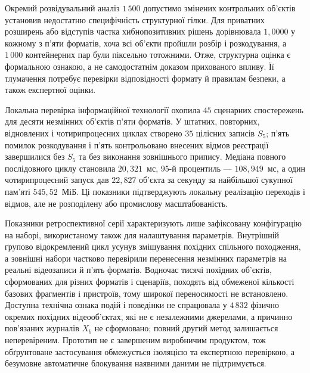 Окремий розвідувальний аналіз $1\,500$ допустимо змінених контрольних об’єктів установив недостатню специфічність структурної гілки. Для приватних розширень або відступів частка хибнопозитивних рішень дорівнювала $1{,}0000$ у кожному з п’яти форматів, хоча всі об’єкти пройшли розбір і розкодування, а $1\,000$ контейнерних пар були піксельно тотожними. Отже, структурна оцінка є формальною ознакою, а не самодостатнім доказом прихованого впливу. Її тлумачення потребує перевірки відповідності формату й правилам безпеки, а також експертної оцінки.

Локальна перевірка інформаційної технології охопила $45$ сценарних спостережень для десяти незмінних об’єктів п’яти форматів. У штатних, повторних, відновлених і чотирипроцесних циклах створено $35$ цілісних записів $S_5$; п’ять помилок розкодування і п’ять контрольовано внесених відмов реєстрації завершилися без $S_5$ та без виконання зовнішнього припису. Медіана повного послідовного циклу становила $20{,}321$~мс, 95-й процентиль --- $108{,}949$~мс, а один чотирипроцесний запуск дав $22{,}827$ об’єкта за секунду за найбільшої сукупної пам’яті $545{,}52$~МіБ. Ці показники підтверджують локальну реалізацію переходів і відмов, але не розподілену або промислову масштабованість.

Показники ретроспективної серії характеризують лише зафіксовану конфігурацію на наборі, використаному також для налаштування параметрів. Внутрішній групово відокремлений цикл усунув змішування похідних спільного походження, а зовнішні набори частково перевірили перенесення незмінних параметрів на реальні відеозаписи й п’ять форматів. Водночас тисячі похідних об’єктів, сформованих для різних форматів і сценаріїв, походять від обмеженої кількості базових фрагментів і пристроїв, тому широкої переносимості не встановлено. Доступна технічна ознака подій і поведінки не спрацювала у $4\,832$ фізично окремих похідних відеооб’єктах, які не є незалежними джерелами, а причинно пов’язаних журналів $X_b$ не сформовано; повний другий метод залишається неперевіреним. Прототип не є завершеним виробничим продуктом, тож обґрунтоване застосування обмежується ізоляцією та експертною перевіркою, а безумовне автоматичне блокування наявними даними не підтримується.

